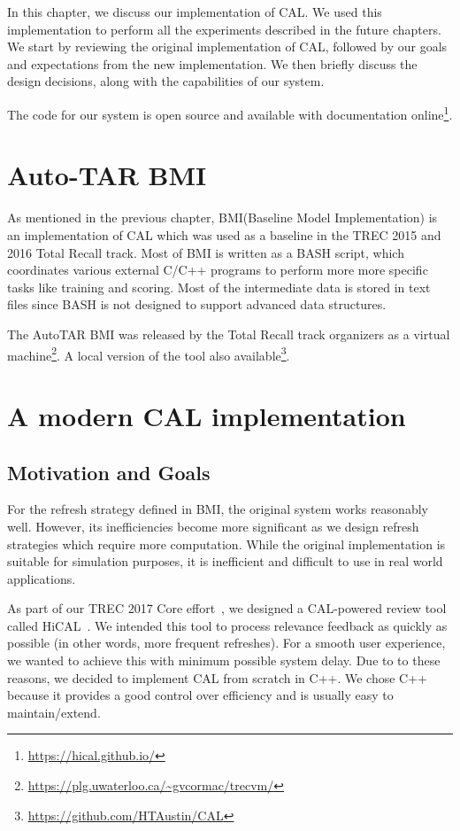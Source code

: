 \label{chap:implementation}
In this chapter, we discuss our implementation of CAL. We used this
implementation to perform all the experiments described in the future chapters.
We start by reviewing the original implementation of CAL, followed by our goals
and expectations from the new implementation. We then briefly discuss the
design decisions, along with the capabilities of our system.

The code for our system is open source and available with documentation
online\footnote{\url{https://hical.github.io/}}.

\section{Auto-TAR BMI}
As mentioned in the previous chapter,
BMI(Baseline Model
Implementation) is an implementation of CAL which was used as a baseline in the
TREC 2015 and 2016 Total Recall track. Most of BMI is written as
a BASH script, which coordinates various external C/C++ programs to perform more
more specific tasks like training and scoring. Most of the intermediate data is
stored in text files since BASH is not designed to support advanced data
structures.

The AutoTAR BMI was released by the Total Recall track organizers as a virtual
machine\footnote{\url{https://plg.uwaterloo.ca/~gvcormac/trecvm/}}. A local
version of the tool also
available\footnote{\url{https://github.com/HTAustin/CAL}}.

\section{A modern CAL implementation}

\subsection{Motivation and Goals}
For the refresh strategy defined in BMI, the original system works reasonably well.
However, its inefficiencies become more significant as we design refresh
strategies which require more computation. While the original
implementation is suitable for simulation purposes, it is inefficient and
difficult to use in real world applications.

As part of our TREC 2017 Core effort~\cite{zhang2017uwaterloomds}, we designed a
CAL-powered review tool called HiCAL~\cite{sigirdemo}. We intended this tool to
process relevance feedback as quickly as possible (in other words, more frequent
refreshes). For a smooth user experience, we wanted to achieve this with minimum
possible system delay. Due to to these reasons, we decided to implement CAL from
scratch in C++. We chose C++ because it provides a good control over efficiency
and is usually easy to maintain/extend.

